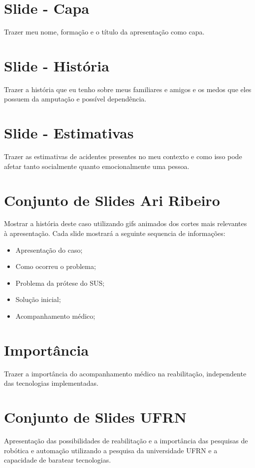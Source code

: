\documentclass[12pt,a4paper]{article}
\begin{document}
    \newpage
    \newpage
    
    \section{Slide - Capa}
    Trazer meu nome, formação e o título da apresentação como capa.

    \section{Slide - História}
    Trazer a história que eu tenho sobre meus familiares e amigos e os medos que eles possuem da amputação e possível dependência.

    \section{Slide - Estimativas}
    Trazer as estimativas de acidentes presentes no meu contexto e como isso pode afetar tanto socialmente quanto emocionalmente uma pessoa.

    \section{Conjunto de Slides Ari Ribeiro}
    Mostrar a história deste caso utilizando gifs animados dos cortes mais relevantes à apresentação.
    Cada slide mostrará a seguinte sequencia de informações:
    \begin{itemize}
        \item Apresentação do caso;
        \item Como ocorreu o problema;
        \item Problema da prótese do SUS;
        \item Solução inicial;
        \item Acompanhamento médico;
    \end{itemize}

    \section{Importância}
    Trazer a importância do acompanhamento médico na reabilitação, independente das tecnologias implementadas.

    \section{Conjunto de Slides UFRN}
    Apresentação das possibilidades de reabilitação e a importância das pesquisas de robótica e automação utilizando a pesquisa da universidade UFRN e a capacidade de baratear tecnologias.
\end{document}
